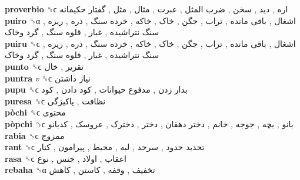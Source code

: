 \textbf{proverbio} ␝ϲ   اره ,  دید ,  سخن ,  ضرب المثل ,  عبرت ,  مثال ,  مثل ,  گفتار حکیمانه   \\
\textbf{puiro} ␝α   اشغال ,  باقی مانده ,  تراب ,  جگن ,  خاک ,  خاکه ,  خرده سنگ ,  ذره ,  ریزه ,  سنگ نتراشیده ,  غبار ,  قلوه سنگ ,  گرد وخاک   \\
\textbf{puiru} ␝ϲ   اشغال ,  باقی مانده ,  تراب ,  جگن ,  خاک ,  خاکه ,  خرده سنگ ,  ذره ,  ریزه ,  سنگ نتراشیده ,  غبار ,  قلوه سنگ ,  گرد وخاک   \\
\textbf{punto} ␝ϲ   تقریر ,  خال   \\
\textbf{puntra} \emph{v}  ␝ϲ   نیاز داشتن   \\
\textbf{pupu} ␝ϲ   بدار زدن ,  مدفوع حیوانات ,  کود دادن ,  کود   \\
\textbf{puresa} ␝ϲ   نظافت ,  پاکیزگی   \\
\textbf{pòchi} ␝ϲ   محتوی   \\
\textbf{pòpchi} ␝ϲ   بانو ,  بچه ,  جوجه ,  خانم ,  دختر دهقان ,  دختر ,  دخترک ,  عروسک ,  کدبانو   \\
\textbf{rabia} ␝ϲ   ممزوج   \\
\textbf{rant} ␝ϲ   تحدید حدود ,  سرحد ,  لبه ,  محیط ,  پیرامون ,  کنار   \\
\textbf{rasa} ␝ϲ   اعقاب ,  اولاد ,  جنس ,  نوع   \\
\textbf{rebaha} ␝α   تخفیف ,  وقفه ,  کاستن ,  کاهش   \\
